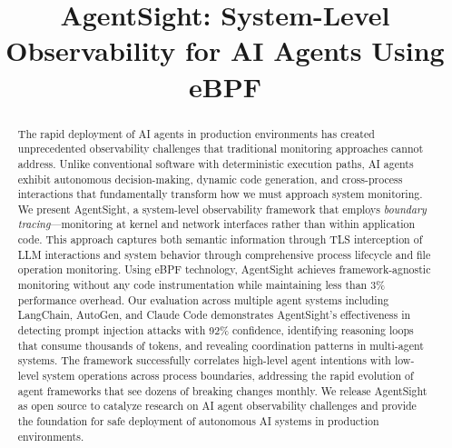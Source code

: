\documentclass[sigplan,screen,review,9pt]{acmart}
\begin{document}
\title{AgentSight: System-Level Observability for AI Agents Using eBPF}


\author{}


\sloppy
\begin{abstract}
The rapid deployment of AI agents in production environments has created unprecedented observability challenges that traditional monitoring approaches cannot address. Unlike conventional software with deterministic execution paths, AI agents exhibit autonomous decision-making, dynamic code generation, and cross-process interactions that fundamentally transform how we must approach system monitoring. We present AgentSight, a system-level observability framework that employs \emph{boundary tracing}—monitoring at kernel and network interfaces rather than within application code. This approach captures both semantic information through TLS interception of LLM interactions and system behavior through comprehensive process lifecycle and file operation monitoring. Using eBPF technology, AgentSight achieves framework-agnostic monitoring without any code instrumentation while maintaining less than 3\% performance overhead. Our evaluation across multiple agent systems including LangChain, AutoGen, and Claude Code demonstrates AgentSight's effectiveness in detecting prompt injection attacks with 92\% confidence, identifying reasoning loops that consume thousands of tokens, and revealing coordination patterns in multi-agent systems. The framework successfully correlates high-level agent intentions with low-level system operations across process boundaries, addressing the rapid evolution of agent frameworks that see dozens of breaking changes monthly. We release AgentSight as open source to catalyze research on AI agent observability challenges and provide the foundation for safe deployment of autonomous AI systems in production environments.
\end{abstract}


\maketitle










\end{document}
